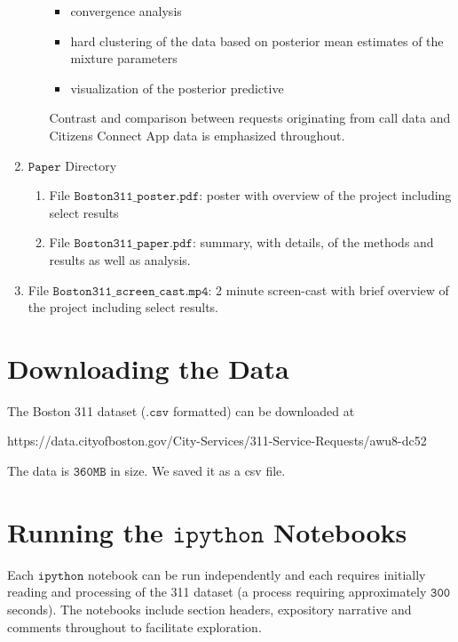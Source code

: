 \documentclass{article}
\theoremstyle{theorem}
\theoremstyle{theorem}
\theoremstyle{theorem}
\theoremstyle{lemma}
\theoremstyle{definition}
\theoremstyle{example}
\begin{document}
\begin{enumerate}
\begin{enumerate}
\begin{itemize}
\item convergence analysis
\item hard clustering of the data based on posterior mean estimates of the mixture parameters
\item visualization of the posterior predictive 
\end{itemize}
Contrast and comparison between requests originating from call data and Citizens Connect App data is emphasized throughout.
\end{enumerate}
\item $\texttt{Paper}$ Directory
\begin{enumerate}
\item File $\texttt{Boston311\_poster.pdf}$: poster with overview of the project including select results
\item File $\texttt{Boston311\_paper.pdf}$: summary, with details, of the methods and results as well as analysis. 
\end{enumerate}
\item File $\texttt{Boston311\_screen\_cast.mp4}$: 2 minute screen-cast with brief overview of the project including select results.
\end{enumerate}

\section{Downloading the Data}
The Boston 311 dataset ($\texttt{.csv}$ formatted) can be downloaded at
\begin{center}
https://data.cityofboston.gov/City-Services/311-Service-Requests/awu8-dc52
\end{center}
The data is $\mathtt{360MB}$ in size. We saved it as a csv file. 
\section{Running the $\texttt{ipython}$ Notebooks}
Each $\texttt{ipython}$ notebook can be run independently and each requires initially reading and processing of the 311 dataset (a process requiring approximately $\mathtt{300}$ seconds). The notebooks include section headers, expository narrative and comments throughout to facilitate exploration. 
\end{document}
